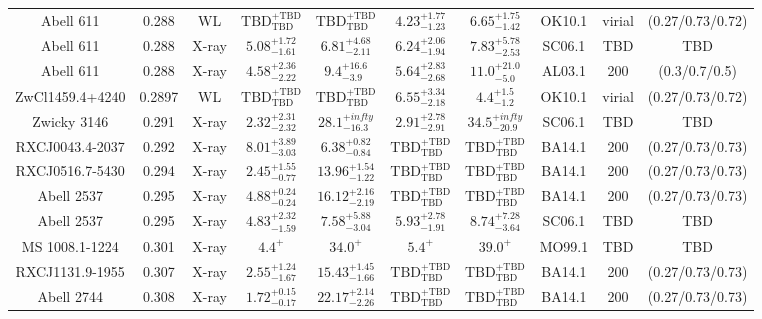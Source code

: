 \begin{table}
\begin{tabular}{cccccccccc}
Abell 611 & 0.288 & WL & ${\mathrm{TBD}}^{+\mathrm{TBD}}_{\mathrm{TBD}}$ & ${\mathrm{TBD}}^{+\mathrm{TBD}}_{\mathrm{TBD}}$ & ${4.23}^{+1.77}_{-1.23}$ & ${6.65}^{+1.75}_{-1.42}$ & OK10.1 & virial & (0.27/0.73/0.72) \\
Abell 611 & 0.288 & X-ray & ${5.08}^{+1.72}_{-1.61}$ & ${6.81}^{+4.68}_{-2.11}$ & ${6.24}^{+2.06}_{-1.94}$ & ${7.83}^{+5.78}_{-2.53}$ & SC06.1 & TBD & TBD \\
Abell 611 & 0.288 & X-ray & ${4.58}^{+2.36}_{-2.22}$ & ${9.4}^{+16.6}_{-3.9}$ & ${5.64}^{+2.83}_{-2.68}$ & ${11.0}^{+21.0}_{-5.0}$ & AL03.1 & 200 & (0.3/0.7/0.5) \\
ZwCl1459.4+4240 & 0.2897 & WL & ${\mathrm{TBD}}^{+\mathrm{TBD}}_{\mathrm{TBD}}$ & ${\mathrm{TBD}}^{+\mathrm{TBD}}_{\mathrm{TBD}}$ & ${6.55}^{+3.34}_{-2.18}$ & ${4.4}^{+1.5}_{-1.2}$ & OK10.1 & virial & (0.27/0.73/0.72) \\
Zwicky 3146 & 0.291 & X-ray & ${2.32}^{+2.31}_{-2.32}$ & ${28.1}^{+infty}_{-16.3}$ & ${2.91}^{+2.78}_{-2.91}$ & ${34.5}^{+infty}_{-20.9}$ & SC06.1 & TBD & TBD \\
RXCJ0043.4-2037 & 0.292 & X-ray & ${8.01}^{+3.89}_{-3.03}$ & ${6.38}^{+0.82}_{-0.84}$ & ${\mathrm{TBD}}^{+\mathrm{TBD}}_{\mathrm{TBD}}$ & ${\mathrm{TBD}}^{+\mathrm{TBD}}_{\mathrm{TBD}}$ & BA14.1 & 200 & (0.27/0.73/0.73) \\
RXCJ0516.7-5430 & 0.294 & X-ray & ${2.45}^{+1.55}_{-0.77}$ & ${13.96}^{+1.54}_{-1.22}$ & ${\mathrm{TBD}}^{+\mathrm{TBD}}_{\mathrm{TBD}}$ & ${\mathrm{TBD}}^{+\mathrm{TBD}}_{\mathrm{TBD}}$ & BA14.1 & 200 & (0.27/0.73/0.73) \\
Abell 2537 & 0.295 & X-ray & ${4.88}^{+0.24}_{-0.24}$ & ${16.12}^{+2.16}_{-2.19}$ & ${\mathrm{TBD}}^{+\mathrm{TBD}}_{\mathrm{TBD}}$ & ${\mathrm{TBD}}^{+\mathrm{TBD}}_{\mathrm{TBD}}$ & BA14.1 & 200 & (0.27/0.73/0.73) \\
Abell 2537 & 0.295 & X-ray & ${4.83}^{+2.32}_{-1.59}$ & ${7.58}^{+5.88}_{-3.04}$ & ${5.93}^{+2.78}_{-1.91}$ & ${8.74}^{+7.28}_{-3.64}$ & SC06.1 & TBD & TBD \\
MS 1008.1-1224 & 0.301 & X-ray & ${4.4}^{+}_{}$ & ${34.0}^{+}_{}$ & ${5.4}^{+}_{}$ & ${39.0}^{+}_{}$ & MO99.1 & TBD & TBD \\
RXCJ1131.9-1955 & 0.307 & X-ray & ${2.55}^{+1.24}_{-1.67}$ & ${15.43}^{+1.45}_{-1.66}$ & ${\mathrm{TBD}}^{+\mathrm{TBD}}_{\mathrm{TBD}}$ & ${\mathrm{TBD}}^{+\mathrm{TBD}}_{\mathrm{TBD}}$ & BA14.1 & 200 & (0.27/0.73/0.73) \\
Abell 2744 & 0.308 & X-ray & ${1.72}^{+0.15}_{-0.17}$ & ${22.17}^{+2.14}_{-2.26}$ & ${\mathrm{TBD}}^{+\mathrm{TBD}}_{\mathrm{TBD}}$ & ${\mathrm{TBD}}^{+\mathrm{TBD}}_{\mathrm{TBD}}$ & BA14.1 & 200 & (0.27/0.73/0.73) \\

\end{tabular}
\end{table}
